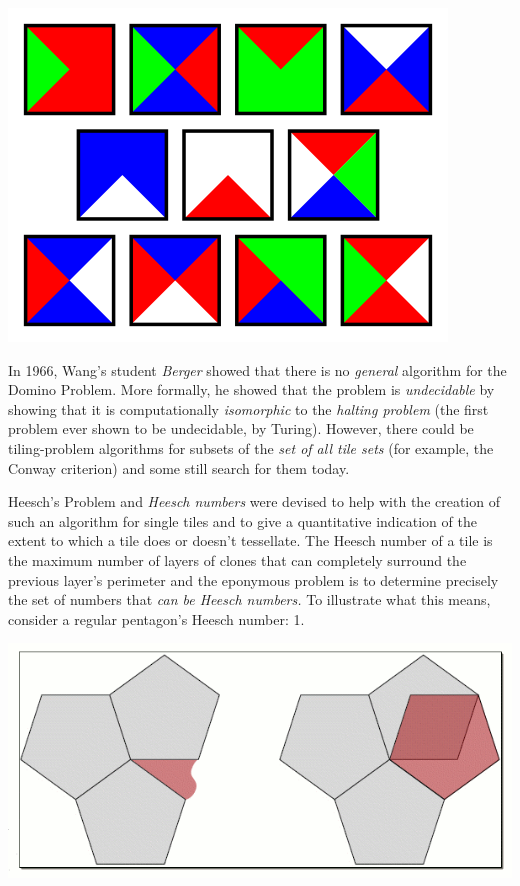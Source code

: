 \documentclass[1opt,a4paper]{article}
\begin{document}
\begin{multicols}{2}
\includegraphics[width=\linewidth]{image_7.png}

In 1966, Wang's student \emph{Berger }showed that there is no
\emph{general }algorithm for the Domino Problem. More formally, he
showed that the problem is \emph{undecidable} by showing that it is
computationally \emph{isomorphic }to the \emph{halting problem }(the
first problem ever shown to be undecidable, by Turing). However, there
could be tiling-problem algorithms for subsets of the \emph{set of all
	tile sets }(for example, the Conway criterion) and some still search
for them today.

Heesch's Problem and \emph{Heesch numbers }were devised to help with the
creation of such an algorithm for single tiles and to give a
quantitative indication of the extent to which a tile does or doesn't
tessellate. The Heesch number of a tile is the maximum number of layers
of clones that can completely surround the previous layer's perimeter
and the eponymous problem is to determine precisely the set of numbers
that \emph{can be Heesch numbers. }To illustrate what this means,
consider a regular pentagon's Heesch number: 1.

\includegraphics[width=\linewidth]{image_8.png}


\end{multicols}
\end{document}
